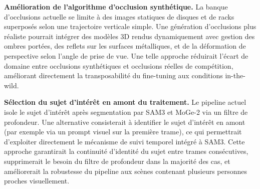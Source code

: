 \textbf{Amélioration de l'algorithme d'occlusion synthétique.} La banque d'occlusions actuelle se limite à des images statiques de disques et de racks superposés selon une trajectoire verticale simple. Une génération d'occlusions plus réaliste pourrait intégrer des modèles 3D rendus dynamiquement avec gestion des ombres portées, des reflets sur les surfaces métalliques, et de la déformation de perspective selon l'angle de prise de vue. Une telle approche réduirait l'écart de domaine entre occlusions synthétiques et occlusions réelles de compétition, améliorant directement la transposabilité du fine-tuning aux conditions in-the-wild.

\textbf{Sélection du sujet d'intérêt en amont du traitement.} Le pipeline actuel isole le sujet d'intérêt après segmentation par SAM3 et MoGe-2 via un filtre de profondeur. Une alternative consisterait à identifier le sujet d'intérêt en amont (par exemple via un prompt visuel sur la première trame), ce qui permettrait d'exploiter directement le mécanisme de suivi temporel intégré à SAM3. Cette approche garantirait la continuité d'identité du sujet entre trames consécutives, supprimerait le besoin du filtre de profondeur dans la majorité des cas, et améliorerait la robustesse du pipeline aux scènes contenant plusieurs personnes proches visuellement.